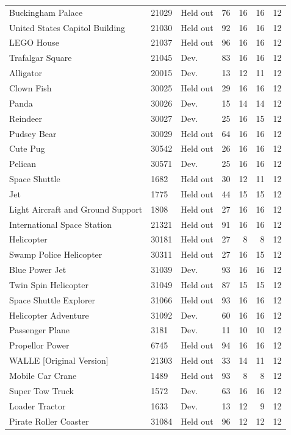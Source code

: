 \begin{longtable}{p{}llrrrr}
Buckingham Palace & 21029 & Held out & 76 & 16 & 16 & 12\\
United States Capitol Building & 21030 & Held out & 92 & 16 & 16 & 12\\
LEGO House & 21037 & Held out & 96 & 16 & 16 & 12\\
Trafalgar Square & 21045 & Dev. & 83 & 16 & 16 & 12\\
Alligator & 20015 & Dev. & 13 & 12 & 11 & 12\\
Clown Fish & 30025 & Held out & 29 & 16 & 16 & 12\\
Panda & 30026 & Dev. & 15 & 14 & 14 & 12\\
Reindeer & 30027 & Dev. & 25 & 16 & 15 & 12\\
Pudsey Bear & 30029 & Held out & 64 & 16 & 16 & 12\\
Cute Pug & 30542 & Held out & 26 & 16 & 16 & 12\\
Pelican & 30571 & Dev. & 25 & 16 & 16 & 12\\
Space Shuttle & 1682 & Held out & 30 & 12 & 11 & 12\\
Jet & 1775 & Held out & 44 & 15 & 15 & 12\\
Light Aircraft and Ground Support & 1808 & Held out & 27 & 16 & 16 & 12\\
International Space Station & 21321 & Held out & 91 & 16 & 16 & 12\\
Helicopter & 30181 & Held out & 27 & 8 & 8 & 12\\
Swamp Police Helicopter & 30311 & Held out & 27 & 16 & 15 & 12\\
Blue Power Jet & 31039 & Dev. & 93 & 16 & 16 & 12\\
Twin Spin Helicopter & 31049 & Held out & 87 & 15 & 15 & 12\\
Space Shuttle Explorer & 31066 & Held out & 93 & 16 & 16 & 12\\
Helicopter Adventure & 31092 & Dev. & 60 & 16 & 16 & 12\\
Passenger Plane & 3181 & Dev. & 11 & 10 & 10 & 12\\
Propellor Power & 6745 & Held out & 94 & 16 & 16 & 12\\
WALL\textbullet{}E [Original Version] & 21303 & Held out & 33 & 14 & 11 & 12\\
Mobile Car Crane & 1489 & Held out & 93 & 8 & 8 & 12\\
Super Tow Truck & 1572 & Dev. & 63 & 16 & 16 & 12\\
Loader Tractor & 1633 & Dev. & 13 & 12 & 9 & 12\\
Pirate Roller Coaster & 31084 & Held out & 96 & 12 & 12 & 12\\

\end{longtable}
